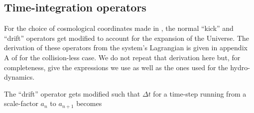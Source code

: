 \subsection{Time-integration operators}
\label{ssec:operators}
For the choice of cosmological coordinates made in \swift, the normal
``kick'' and ``drift'' operators get modified to account for the
expansion of the Universe. The derivation of these operators from the
system's Lagrangian is given in appendix A of \cite{Quinn1997} for the
collision-less case. We do not repeat that derivation here but, for
completeness, give the expressions we use as well as the ones used for
the hydro-dynamics. 

The ``drift'' operator gets modified such that $\Delta t$ for a
time-step running from a scale-factor $a_{n}$ to $a_{n+1}$ becomes

